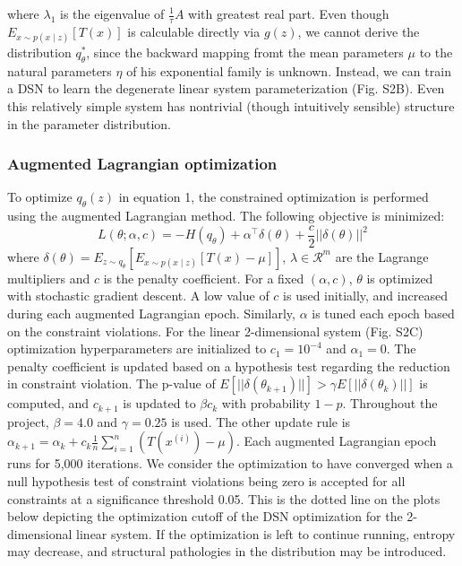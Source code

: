 \documentclass[11pt]{article}
\begin{document}
where $\lambda_1$ is the eigenvalue of $\frac{1}{\tau}A$ with greatest real part.
Even though $E_{x\sim p(x \mid z)}\left[T(x)\right]$ is calculable directly via $g(z)$, we cannot derive the distribution $q^*_\theta$, since the backward mapping fromt the mean parameters $\mu$ to the natural parameters $\eta$ of his exponential family is unknown.  Instead, we can train a DSN to learn the degenerate linear system parameterization (Fig. S2B). Even this relatively simple system has nontrivial (though intuitively sensible) structure in the parameter distribution.\\

\subsubsection{Augmented Lagrangian optimization}
To optimize $q_\theta(z)$ in equation 1, the constrained optimization is performed using the augmented Lagrangian method.  The following objective is minimized:
\begin{equation}
L(\theta; \alpha, c) = -H(q_\theta) + \alpha^\top \delta(\theta) + \frac{c}{2}||\delta(\theta)||^2
\end{equation}
where $\delta(\theta) = E_{z \sim q_\theta}\left[ E_{x\sim p(x \mid z)}\left[T(x) - \mu \right] \right]$, $\lambda \in \mathcal{R}^m$ are the Lagrange multipliers and $c$ is the penalty coefficient.  For a fixed $(\alpha, c)$, $\theta$ is optimized with stochastic gradient descent.  A low value of $c$ is used initially, and increased during each augmented Lagrangian epoch. Similarly, $\alpha$ is tuned each epoch based on the constraint violations.  For the linear 2-dimensional system (Fig. S2C) optimization hyperparameters are initialized to $c_1 = 10^{-4}$ and $\alpha_1 = 0$.  The penalty coefficient is updated based on a hypothesis test regarding the reduction in constraint violation.  The p-value of $E[||\delta(\theta_{k+1})||] > \gamma E[||\delta(\theta_{k})||]$ is computed, and $c_{k+1}$ is updated  to $\beta c_k$ with probability $1-p$.  Throughout the project, $\beta = 4.0$ and $\gamma = 0.25$ is used.  The other update rule is $\alpha_{k+1} = \alpha_k + c_k \frac{1}{n} \sum_{i=1}^n (T(x^{(i)}) - \mu)$.  Each augmented Lagrangian epoch runs for 5,000 iterations.  We consider the optimization to have converged when a null hypothesis test of constraint violations being zero is accepted for all constraints at a significance threshold 0.05.  This is the dotted line on the plots below depicting the optimization cutoff of the DSN optimization for the 2-dimensional linear system.  If the optimization is left to continue running, entropy may decrease, and structural pathologies in the distribution may be introduced.
\end{document}
